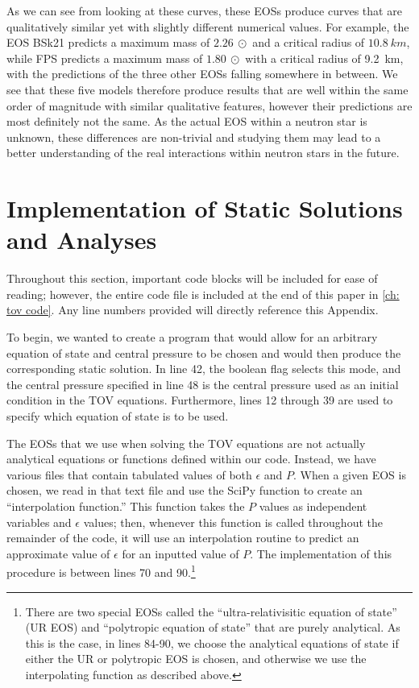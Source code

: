 As we can see from looking at these curves, these EOSs produce curves that are qualitatively similar yet with slightly different numerical values. For example, the EOS BSk21 predicts a maximum mass of $\SI{2.26}{\odot}$ and a critical radius of $\SI{10.8}{km}$, while FPS predicts a maximum mass of $\SI{1.80}{\odot}$ with a critical radius of \SI{9.2}{km}, with the predictions of the three other EOSs falling somewhere in between. We see that these five models therefore produce results that are well within the same order of magnitude with similar qualitative features, however their predictions are most definitely not the same. As the actual EOS within a neutron star is unknown, these differences are non-trivial and studying them may lead to a better understanding of the real interactions within neutron stars in the future.

\section{Implementation of Static Solutions and Analyses}


Throughout this section, important code blocks will be included for ease of reading; however, the entire code file is included at the end of this paper in \autoref{ch: tov code}. Any line numbers provided will directly reference this Appendix.

To begin, we wanted to create a program that would allow for an arbitrary equation of state and central pressure to be chosen and would then produce the corresponding static solution. In line 42, the boolean flag  selects this mode, and the central pressure specified in line 48 is the central pressure used as an initial condition in the TOV equations. Furthermore, lines 12 through 39 are used to specify which equation of state is to be used.

The EOSs that we use when solving the TOV equations are not actually analytical equations or functions defined within our code. Instead, we have various  files that contain tabulated values of both $\epsilon$ and $P$. When a given EOS is chosen, we read in that text file and use the SciPy function  to create an ``interpolation function.'' This function takes the $P$ values as independent variables and $\epsilon$ values; then, whenever this function is called throughout the remainder of the code, it will use an interpolation routine to predict an approximate value of $\epsilon$ for an inputted value of $P$. The implementation of this procedure is between lines 70 and 90.\footnote{There are two special EOSs called the ``ultra-relativisitic equation of state'' (UR EOS) and ``polytropic equation of state'' that are purely analytical. As this is the case, in lines 84-90, we choose the analytical equations of state if either the UR or polytropic EOS is chosen, and otherwise we use the interpolating function as described above.}

